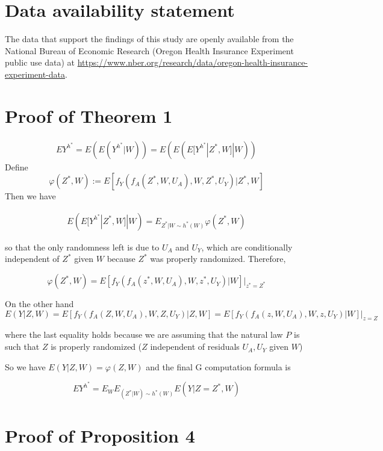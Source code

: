 \documentclass[12pt]{article}
\theoremstyle{thmstyleone}%
\theoremstyle{thmstyletwo}%
\theoremstyle{thmstylethree}%
\begin{document}
\section*{Data availability statement}

The data that support the findings of this study are openly available from the National Bureau of Economic Research (Oregon Health Insurance Experiment public use data) at \url{https://www.nber.org/research/data/oregon-health-insurance-experiment-data}.


  



\section{Proof of Theorem 1}


$$\begin{aligned}
	EY^{h^*} = E( E(Y^{h^*} |W)) =  E( 	E(E[Y^{h^*}|Z^*,W] |W)) 
\end{aligned}$$
Define  $$\varphi(Z^*,W):=E[f_Y(f_A(Z^*,W,U_A),W,Z^*,U_Y)|Z^*,W]$$ 
Then we have


$$\begin{aligned}
	E(E[Y^{h^*}|Z^*,W] |W) = E_{Z^*|W \sim h^*(W)}\varphi(Z^*,W)
\end{aligned}$$

so that the only randomness left is due to $U_A$ and $U_Y$, which are conditionally independent of $Z^*$ given $W$ because $Z^*$ was properly randomized. Therefore,

$$\varphi(Z^*,W)=E[f_Y(f_A(z^*,W,U_A),W,z^*,U_Y)|W] \Big|_{z^*=Z^*}$$



On the other hand
$$E(Y|Z,W)=E[f_Y(f_A(Z,W,U_A),W,Z,U_Y)|Z,W] = E[f_Y(f_A(z,W,U_A),W,z,U_Y)|W] \Big|_{z=Z}$$

where the last equality holds because we are assuming that the natural law $P$ is such that $Z$ is properly randomized ($Z$ independent of residuals $U_A,U_Y$ given $W$)

So we have $E(Y|Z,W) = \varphi(Z,W)$ and the final G computation formula is 

$$EY^{h^*} = E_WE_{(Z^*|W) \sim h^*(W)}E(Y|Z=Z^*,W)$$


 

\section{Proof of Proposition 4}
\end{document}
